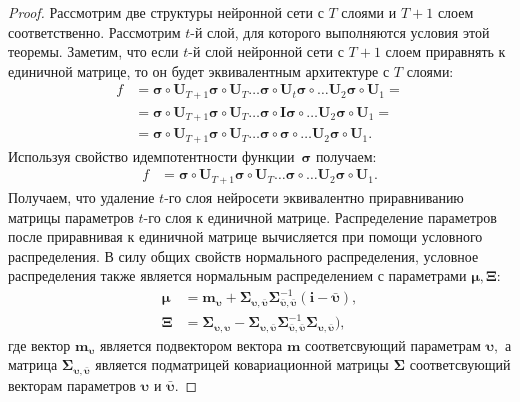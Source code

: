 \begin{proof}
Рассмотрим две структуры нейронной сети с $T$ слоями и $T+1$ слоем соответственно. Рассмотрим $t$-й слой, для которого выполняются условия этой теоремы. Заметим, что если $t$-й слой нейронной сети с $T+1$ слоем приравнять к единичной матрице, то он будет эквивалентным архитектуре с $T$ слоями:
\[
\begin{aligned}
f &= \bm{\sigma} \circ \mathbf{U}_{T+1}\bm{\sigma} \circ \mathbf{U}_T \ldots \bm{\sigma} \circ \mathbf{U}_t\bm{\sigma} \circ \ldots  \mathbf{U}_2\bm{\sigma} \circ \mathbf{U}_1 =\\
&=  \bm{\sigma} \circ \mathbf{U}_{T+1}\bm{\sigma} \circ \mathbf{U}_T \ldots \bm{\sigma} \circ \mathbf{I}\bm{\sigma} \circ \ldots  \mathbf{U}_2\bm{\sigma} \circ \mathbf{U}_1 =\\
&=  \bm{\sigma} \circ \mathbf{U}_{T+1}\bm{\sigma} \circ \mathbf{U}_T \ldots \bm{\sigma} \circ \bm{\sigma} \circ \ldots  \mathbf{U}_2\bm{\sigma} \circ \mathbf{U}_1.
\end{aligned}
\]
Используя свойство идемпотентности функции~$\bm{\sigma}$ получаем:
\[
\label{ch:3:eq:ap:tr:2:1}
\begin{aligned}
f &= \bm{\sigma} \circ \mathbf{U}_{T+1}\bm{\sigma} \circ \mathbf{U}_T \ldots \bm{\sigma} \circ \ldots  \mathbf{U}_2\bm{\sigma} \circ \mathbf{U}_1.
\end{aligned}
\]
Получаем, что удаление $t$-го слоя нейросети эквивалентно приравниванию матрицы параметров $t$-го слоя к единичной матрице. Распределение параметров после приравнивая к единичной матрице вычисляется при помощи условного распределения. В силу общих свойств нормального распределения, условное распределения также является нормальным распределением с параметрами $\bm{\mu}, \bm{\Xi}:$
\[
\label{ch:3:eq:ap:tr:2:2}
\begin{aligned}
\bm{\mu} &= \mathbf{m}_{\bm{\upsilon}}+\bm{\Sigma}_{\bm{\upsilon},\bar{\bm{\upsilon}}} \bm{\Sigma}_{\bar{\bm{\upsilon}},\bar{\bm{\upsilon}}}^{-1} \left(\mathbf{i} - \bar{\bm{\upsilon}}\right), \\
\bm{\Xi} &= \bm{\Sigma}_{\bm{\upsilon},\bm{\upsilon}} - \bm{\Sigma}_{\bm{\upsilon},\bar{\bm{\upsilon}}}\bm{\Sigma}_{\bar{\bm{\upsilon}},\bar{\bm{\upsilon}}}^{-1}\bm{\Sigma}_{\bm{\upsilon},\bar{\bm{\upsilon}}}\bigr),
\end{aligned}
\]
где вектор $\mathbf{m}_{\bm{\upsilon}}$ является подвектором вектора $\mathbf{m}$ соответсвующий параметрам $\bm{\upsilon},$ а матрица $\bm{\Sigma}_{\bm{\upsilon},\bar{\bm{\upsilon}}}$ является подматрицей ковариационной матрицы $\bm{\Sigma}$ соответсвующий векторам параметров $\bm{\upsilon}$ и $\bar{\bm{\upsilon}}.$
\end{proof}


